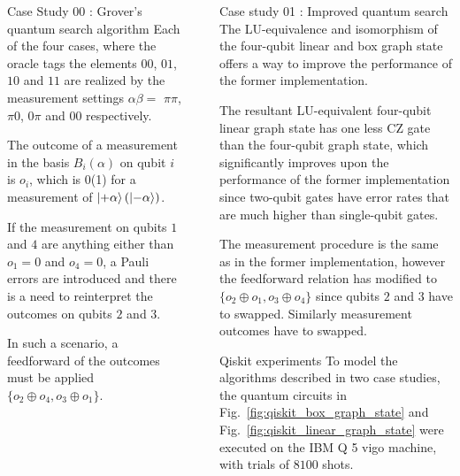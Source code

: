 \documentclass[final]{beamer}
\newlength{\sepwidth}
\newlength{\colwidth}
\newcommand{\separatorcolumn}{\begin{column}{\sepwidth}\end{column}}
\begin{document}
\begin{frame}[t]
\begin{columns}[t]
\begin{column}{\colwidth}
\begin{block}{Case Study 00 : Grover's quantum search algorithm}
                    Each of the four cases, where the oracle tags the elements
                    $00$, $01$, $10$ and $11$ are realized by the measurement
                    settings $\alpha\beta = $ $\pi\pi$, $\pi0$, $0\pi$ and $00$
                    respectively.

                    The outcome of a measurement in the basis $B_i(\alpha)$ on
                    qubit $i$ is $o_i$, which is 0(1) for a measurement of
                    $\ket{+\alpha}(\ket{-\alpha})$.

                    If the measurement on qubits $1$ and $4$ are anything either
                    than $o_1= 0$ and $o_4= 0$, a Pauli errors are introduced and there
                    is a need to reinterpret the outcomes on qubits $2$ and $3$.

                    In such a scenario, a feedforward of the outcomes must be applied 
                    $\{o_2 \oplus o_4, o_3 \oplus o_ 1\}$.
                \end{block}
            \end{column}

            \separatorcolumn

            \begin{column}{\colwidth}
                \begin{block}{Case study 01 : Improved quantum search}
                    The LU-equivalence and isomorphism of the four-qubit linear and box
                    graph state offers a way to improve the performance of the
                    former implementation.

                    The resultant LU-equivalent four-qubit
                    linear graph state has one less $\text{CZ}$ gate than the
                    four-qubit graph state, which significantly improves upon
                    the performance of the former implementation since two-qubit
                    gates have error rates that are much higher than
                    single-qubit gates.

                    The measurement procedure is the same as in the former
                    implementation, however the feedforward relation has
                    modified to $\{o_2 \oplus o_1, o_3 \oplus o_4 \}$ since
                    qubits $2$ and $3$ have to swapped. Similarly measurement outcomes have
                    to swapped.

                \end{block}
                \begin{block}{Qiskit experiments}
                    To model the algorithms described in two case studies, the
                    quantum circuits in Fig.~\ref{fig:qiskit_box_graph_state}
                    and Fig.~\ref{fig:qiskit_linear_graph_state} were executed on the
                    IBM Q 5 vigo machine, with trials of $8100$ shots.


\end{block}
\end{column}
\end{columns}
\end{frame}
\end{document}
